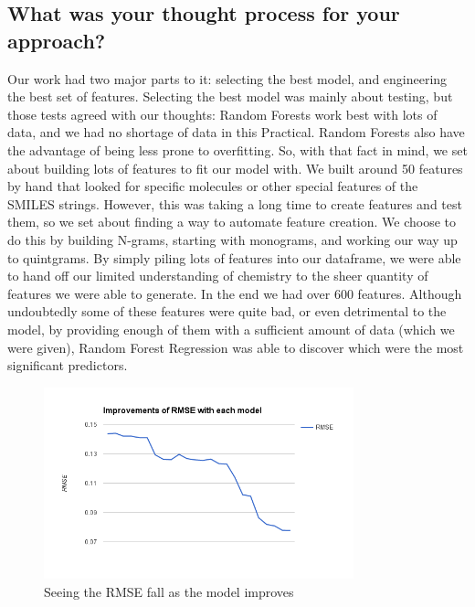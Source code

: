 \documentclass[]{article}
\begin{document}
\subsection*{What was your thought process for your approach?}
\begin{flushleft}
	Our work had two major parts to it: selecting the best model, and engineering the best set of features.  Selecting the best model was mainly about testing, but those tests agreed with our thoughts:  Random Forests work best with lots of data, and we had no shortage of data in this Practical.  
	\newline\newline
	Random Forests also have the advantage of being less prone to overfitting.  So, with that fact in mind, we set about building lots of features to fit our model with.  We built around 50 features by hand that looked for specific molecules or other special features of the SMILES strings.  However, this was taking a long time to create features and test them, so we set about finding a way to automate feature creation.  We choose to do this by building N-grams, starting with monograms, and working our way up to quintgrams.  By simply piling lots of features into our dataframe, we were able to hand off our limited understanding of chemistry to the sheer quantity of features we were able to generate.  In the end we had over 600 features.  Although undoubtedly some of these features were quite bad, or even detrimental to the model, by providing enough of them with a sufficient amount of data (which we were given), Random Forest Regression was able to discover which were the most significant predictors.
	\newline\newline
	\begin{figure}[h]
		\centering
		\includegraphics[width=0.8\textwidth]{overall_rmse}
		\caption{Seeing the RMSE fall as the model improves}
	\end{figure}
\end{flushleft}	
\end{document}
